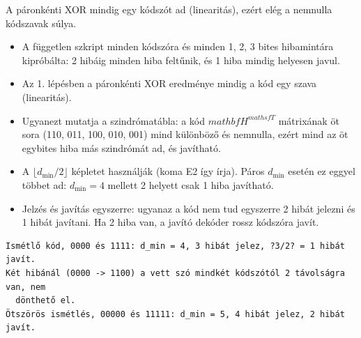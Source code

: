 A páronkénti XOR mindig egy kódszót ad (linearitás), ezért elég a nemnulla kódszavak súlya.

\begin{center}\end{center}
\begin{eredmeny}

\begin{center}\end{center}
\end{eredmeny}
\begin{tipp}[Ellenőrzés]
\begin{itemize}
\item A független szkript minden kódszóra és minden 1, 2, 3 bites hibamintára kipróbálta: 2 hibáig minden hiba feltűnik, és 1 hiba mindig helyesen javul.
\item Az 1. lépésben a páronkénti XOR eredménye mindig a kód egy szava (linearitás).
\item Ugyanezt mutatja a szindrómatábla: a kód $mathbf H^{mathsf T}$ mátrixának öt sora (110, 011, 100, 010, 001) mind különböző és nemnulla, ezért mind az öt egybites hiba más szindrómát ad, és javítható.
\end{itemize}
\end{tipp}
\begin{figyelem}
\begin{itemize}
\item A $\lfloor d_{\min}/2\rfloor$ képletet használják (koma E2 így írja). Páros $d_{\min}$ esetén ez eggyel többet ad: $d_{\min}=4$ mellett 2 helyett csak 1 hiba javítható.
\item Jelzés és javítás egyszerre: ugyanaz a kód nem tud egyszerre 2 hibát jelezni és 1 hibát javítani. Ha 2 hiba van, a javító dekóder rossz kódszóra javít.
\end{itemize}
\end{figyelem}
\begin{tipp}
\small
\begin{verbatim}
Ismétlő kód, 0000 és 1111: d_min = 4, 3 hibát jelez, ?3/2? = 1 hibát javít.
Két hibánál (0000 -> 1100) a vett szó mindkét kódszótól 2 távolságra van, nem
  dönthető el.
Ötszörös ismétlés, 00000 és 11111: d_min = 5, 4 hibát jelez, 2 hibát javít.
\end{verbatim}
\end{tipp}
